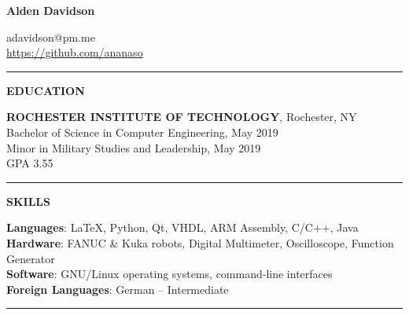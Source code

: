 \documentclass[11pt]{article}
\newcommand{\leftColSize}{0.22}		%
\newcommand{\rightColSize}{0.78}	%
\begin{document}
\begin{center}
\begin{minipage}[b]{0.70\textwidth}
	{\Huge\textbf{Alden Davidson}}
\end{minipage}%
\begin{minipage}[b]{0.30\textwidth}
	\raggedleft
	adavidson@pm.me\\
    \url{https://github.com/ananaso}
\end{minipage}
\end{center}
\textcolor{black!60}{\rule{\textwidth}{3pt}}
\begin{center}
\begin{minipage}[t]{\leftColSize\textwidth}
\textbf{EDUCATION}
\end{minipage}%
\begin{minipage}[t]{\rightColSize\textwidth}
\textbf{ROCHESTER INSTITUTE OF TECHNOLOGY}, Rochester, NY\\
Bachelor of Science in Computer Engineering, May 2019\\
Minor in Military Studies and Leadership, May 2019\\
GPA 3.55
\end{minipage}
\end{center}
\textcolor{black!20}{\rule{\textwidth}{3pt}}
\begin{center}
\begin{minipage}[t]{\leftColSize\textwidth}
\textbf{SKILLS}
\end{minipage}%
\begin{minipage}[t]{\rightColSize\textwidth}
\textbf{Languages}: \LaTeX, Python, Qt, VHDL, ARM Assembly, C/C++, Java\\
\textbf{Hardware}: FANUC \& Kuka robots, Digital Multimeter, Oscilloscope, Function Generator\\
\textbf{Software}: GNU/Linux operating systems, command-line interfaces\\
\textbf{Foreign Languages}: German -- Intermediate
\end{minipage}
\end{center}
\textcolor{black!20}{\rule{\textwidth}{3pt}}
\end{document}
